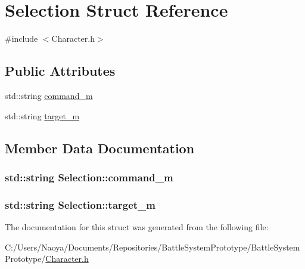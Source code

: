 \hypertarget{struct_selection}{}\section{Selection Struct Reference}
\label{struct_selection}


{\ttfamily \#include $<$Character.\+h$>$}

\subsection*{Public Attributes}
\begin{DoxyCompactItemize}
\item 
std\+::string \hyperlink{struct_selection_ad77843ce60bb053ae8fcd374c9bb7cbd}{command\+\_\+m}
\item 
std\+::string \hyperlink{struct_selection_a1b21fefdc3fa3795f1c0a4701e9f8ee9}{target\+\_\+m}
\end{DoxyCompactItemize}


\subsection{Member Data Documentation}
\hypertarget{struct_selection_ad77843ce60bb053ae8fcd374c9bb7cbd}{}
\subsubsection[{command\+\_\+m}]{\setlength{\rightskip}{0pt plus 5cm}std\+::string Selection\+::command\+\_\+m}\label{struct_selection_ad77843ce60bb053ae8fcd374c9bb7cbd}
\hypertarget{struct_selection_a1b21fefdc3fa3795f1c0a4701e9f8ee9}{}
\subsubsection[{target\+\_\+m}]{\setlength{\rightskip}{0pt plus 5cm}std\+::string Selection\+::target\+\_\+m}\label{struct_selection_a1b21fefdc3fa3795f1c0a4701e9f8ee9}


The documentation for this struct was generated from the following file\+:\begin{DoxyCompactItemize}
\item 
C\+:/\+Users/\+Naoya/\+Documents/\+Repositories/\+Battle\+System\+Prototype/\+Battle\+System\+Prototype/\hyperlink{_character_8h}{Character.\+h}\end{DoxyCompactItemize}
